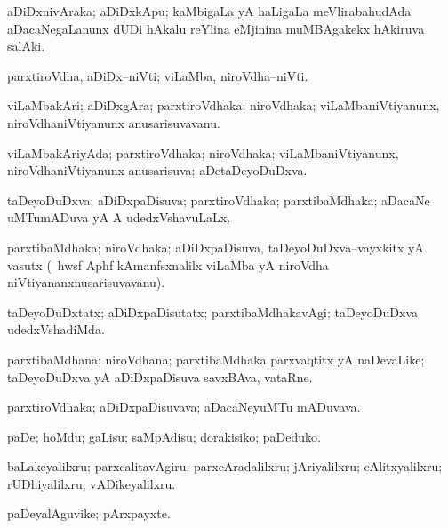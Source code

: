 \bentry
{}
\gl{\nA}
\bmng
aDiDxnivAraka; aDiDxkApu; kaMbigaLa yA haLigaLa meVlirabahudAda aDacaNegaLanunx dUDi hAkalu reYlina eMjinina muMBAgakekx hAkiruva salAki. 
\emng
\eentry

\bentry
{}
\gl{\nA}
\bmng
parxtiroVdha, aDiDx--niVti; viLaMba, niroVdha--niVti. 
\emng
\eentry

\bentry
{}
\gl{\nA}
\bmng
viLaMbakAri; aDiDxgAra; parxtiroVdhaka; niroVdhaka; viLaMbaniVtiyanunx, niroVdhaniVtiyanunx anusarisuvavanu. 
\emng
\eentry

\bentry
{}
\gl{\gu}
\bmng
viLaMbakAriyAda; parxtiroVdhaka; niroVdhaka; viLaMbaniVtiyanunx, niroVdhaniVtiyanunx anusarisuva; aDetaDeyoDuDxva. 
\emng
\eentry

\bentry
{}
\gl{\gu}
\bmng
taDeyoDuDxva; aDiDxpaDisuva; parxtiroVdhaka; parxtibaMdhaka; aDacaNe uMTumADuva yA A udedxVshavuLaLx. 
\emng
\eentry

\bentry
{}
\gl{\nA}
\bmng
parxtibaMdhaka; niroVdhaka; aDiDxpaDisuva, taDeyoDuDxva--vayxkitx yA vasutx (\kanmu\ hwsf Aphf kAmanfsxnalilx viLaMba yA niroVdha niVtiyananxnusarisuvavanu). 
\emng
\eentry

\bentry
{}
\gl{\kirxvi}
\bmng
taDeyoDuDxtatx; aDiDxpaDisutatx; parxtibaMdhakavAgi; taDeyoDuDxva udedxVshadiMda. 
\emng
\eentry

\bentry
{}
\gl{\nA}
\bmng
parxtibaMdhana; niroVdhana; parxtibaMdhaka parxvaqtitx yA naDevaLike; taDeyoDuDxva yA aDiDxpaDisuva savxBAva, vataRne. 
\emng
\eentry

\bentry
{}
\gl{\nA }
\bmng
parxtiroVdhaka; aDiDxpaDisuvava; aDacaNeyuMTu mADuvava. 
\emng
\eentry

\bentry
{}
\gl{\sakirx}
\bmng
paDe; hoMdu; gaLisu; saMpAdisu; dorakisiko; paDeduko. 
\emng

\noindent
\gl{\akirx}
\bmng
baLakeyalilxru; parxcalitavAgiru; parxcAradalilxru; jAriyalilxru; cAlitxyalilxru; rUDhiyalilxru; vADikeyalilxru. 
\emng
\eentry

\bentry
{}
\gl{\nA}
\bmng
paDeyalAguvike; pArxpayxte. 
\emng
\eentry

